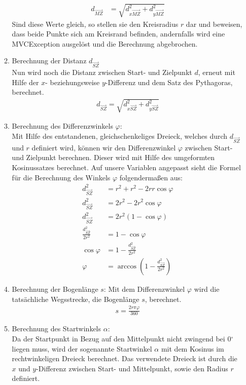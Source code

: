 \begin{itemize}
\begin{enumerate}
\begin{align*}
d_{\overrightarrow{MZ}} & = \sqrt{d_{x\overrightarrow{MZ}}^2 + d_{y\overrightarrow{MZ}}^2}
\end{align*}
Sind diese Werte gleich, so stellen sie den Kreisradius $r$ dar und beweisen, dass beide Punkte sich am Kreisrand befinden, andernfalls wird eine MVCException ausgelöst und die Berechnung abgebrochen. 
\item Berechnung der Distanz $d_{\overrightarrow{SZ}}$\\
Nun wird noch die Distanz zwischen Start- und Zielpunkt $d$, erneut mit Hilfe der $x$- beziehungsweise $y$-Differenz und dem Satz des Pythagoras, berechnet.
\begin{align*}
d_{\overrightarrow{SZ}} = \sqrt{d_{x\overrightarrow{SZ}}^2 + d_{y\overrightarrow{SZ}}^2}
\end{align*}
\item Berechnung des Differenzwinkels $\varphi$:\\
Mit Hilfe des entstandenen, gleichschenkeliges Dreieck, welches durch $d_{\overrightarrow{SZ}}$ und $r$ definiert wird, können wir den Differenzwinkel $\varphi$ zwischen Start- und Zielpunkt berechnen. Dieser wird mit Hilfe des umgeformten Kosinussatzes berechnet. Auf unsere Variablen angepasst sieht die Formel für die Berechnung des Winkels $\varphi$ folgendermaßen aus:
\begin{align*}
d_{\overrightarrow{SZ}}^2 & = r^2 + r^2 - 2rr \cos \varphi \\
d_{\overrightarrow{SZ}}^2 & = 2r^2 - 2r^2 \cos \varphi \\
d_{\overrightarrow{SZ}}^2 & = 2r^2(1 - \cos \varphi) \\
\frac{d_{\overrightarrow{SZ}}^2}{2r^2} & = 1 - \cos \varphi \\
\cos \varphi & = 1 - \frac{d_{\overrightarrow{SZ}}^2}{2r^2} \\
\varphi & = \arccos (1 - \frac{d_{\overrightarrow{SZ}}^2}{2r^2})
\end{align*}
\item Berechnung der Bogenlänge $s$:
Mit dem Differenzwinkel $\varphi$ wird die tatsächliche Wegsstrecke, die Bogenlänge $s$, berechnet.
\begin{align*}
s = \frac{2r \pi \varphi}{360}
\end{align*}
\item Berechnung des Startwinkels $\alpha$:\\
Da der Startpunkt in Bezug auf den Mittelpunkt nicht zwingend bei 0$^\circ$ liegen muss, wird der sogenannte Startwinkel $\alpha$ mit dem Kosinus im rechtwinkeligen Dreieck berechnet. Das verwendete Dreieck ist durch die $x$ und $y$-Differenz zwischen Start- und Mittelpunkt, sowie den Radius $r$ definiert.

\end{enumerate}
\end{itemize}
